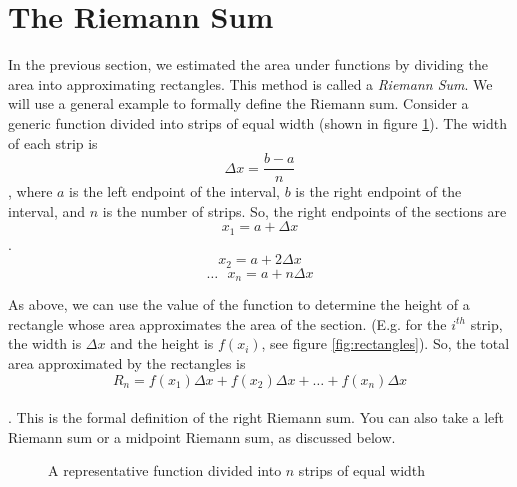 \section{The Riemann Sum}
In the previous section, we estimated the area under functions by dividing the area into approximating rectangles. This method is called a \textit{Riemann Sum}. We will use a general example to formally define the Riemann sum. Consider a generic function divided into strips of equal width (shown in figure \ref{fig:strips}). The width of each strip is $$\Delta x=\frac{b-a}{n}$$, where $a$ is the left endpoint of the interval, $b$ is the right endpoint of the interval, and $n$ is the number of strips. So, the right endpoints of the sections are $$x_1=a+\Delta x$$.
$$x_2 = a +2\Delta x$$
$$\ldots \text{ }x_n=a+n\Delta x$$

As above, we can use the value of the function to determine the height of a rectangle whose area approximates the area of the section. (E.g. for the $i^{th}$ strip, the width is $\Delta x$ and the height is $f(x_i)$, see figure \ref{fig:rectangles}). So, the total area approximated by the rectangles is $$R_n = f(x_1)\Delta x + f(x_2)\Delta x + \ldots + f(x_n)\Delta x$$ \\. This is the formal definition of the right Riemann sum. You can also take a left Riemann sum or a midpoint Riemann sum, as discussed below. 

\begin{figure}
\caption{A representative function divided into $n$ strips of equal width}
\label{fig:strips}
\end{figure}


